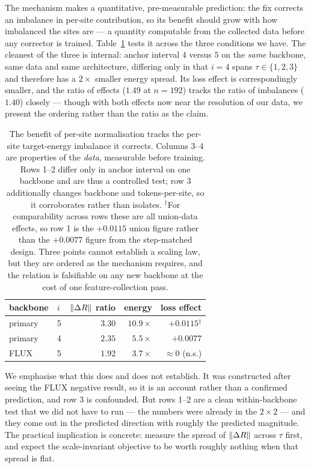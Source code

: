The mechanism makes a quantitative, pre-measurable prediction: the fix corrects an
imbalance in per-site contribution, so its benefit should grow with how imbalanced the
sites are --- a quantity computable from the collected data before any corrector is
trained. Table~\ref{tab:scaling} tests it across the three conditions we have. The
cleanest of the three is internal: anchor interval $4$ versus $5$ on the \emph{same}
backbone, same data and same architecture, differing only in that $i{=}4$ spans
$\tau \in \{1,2,3\}$ and therefore has a $2\times$ smaller energy spread. Its loss
effect is correspondingly smaller, and the ratio of effects ($1.49$ at $n{=}192$)
tracks the ratio of imbalances ($1.40$) closely --- though with both effects now near
the resolution of our data, we present the ordering rather than the ratio as the
claim.

\begin{table}[t]
\centering\small
\begin{tabular}{llrrr}
\toprule
backbone & $i$ & $\lVert\Delta R\rVert$ ratio & energy & loss effect \\
\midrule
primary & 5 & $3.30$ & $10.9\times$ & $+0.0115$$^\ddagger$ \\
primary & 4 & $2.35$ & $5.5\times$  & $+0.0077$ \\
FLUX    & 5 & $1.92$ & $3.7\times$  & $\approx 0$ (n.s.) \\
\bottomrule
\end{tabular}
\caption{The benefit of per-site normalisation tracks the per-site target-energy
imbalance it corrects. Columns 3--4 are properties of the \emph{data}, measurable
before training. Rows 1--2 differ only in anchor interval on one backbone and are
thus a controlled test; row 3 additionally changes backbone and tokens-per-site, so it
corroborates rather than isolates. $^\ddagger$For comparability across rows these are all union-data
effects, so row 1 is the $+0.0115$ union figure rather than the $+0.0077$ figure from
the step-matched design. Three points cannot establish a scaling law, but they are ordered as the mechanism
requires, and the relation is falsifiable on any
new backbone at the cost of one feature-collection pass.}
\label{tab:scaling}
\end{table}

We emphasise what this does and does not establish. It was constructed after seeing
the FLUX negative result, so it is an account rather than a confirmed prediction, and
row 3 is confounded. But rows 1--2 are a clean within-backbone test that we did not
have to run --- the numbers were already in the $2\times2$ --- and they come out in the
predicted direction with roughly the predicted magnitude. The practical implication is
concrete: measure the spread of $\lVert\Delta R\rVert$ across $\tau$ first, and expect the
scale-invariant objective to be worth roughly nothing when that spread is flat.

